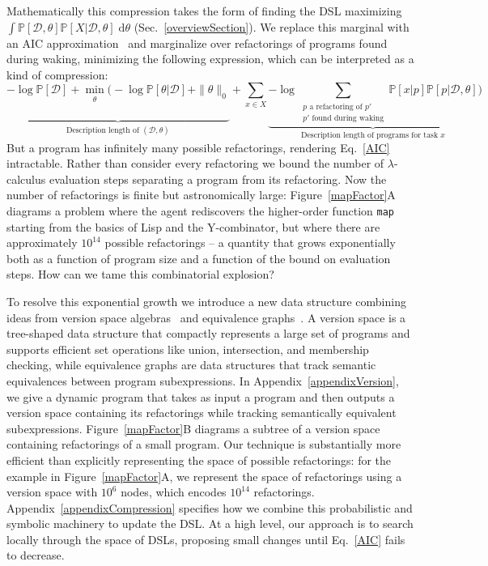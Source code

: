 \documentclass{article}
\newcommand{\code}[1]{{\footnotesize\texttt{#1}}}
\newcommand{\probability}{\mathds{P}} %
\begin{document}
Mathematically this compression takes the form of
finding the DSL maximizing $\int \probability[\mathcal{D},\theta]\probability[X|\mathcal{D},\theta]\;\mathrm{d}\theta$ (Sec.~\ref{overviewSection}).
We replace this marginal with an AIC approximation~\cite{akaike1998information}
and marginalize over refactorings of programs found during waking, minimizing the following expression,
which can be interpreted as a kind of compression:
\begin{equation}
\underbrace{-\log \probability[\mathcal{D}] + \min_{\substack{\theta\\\\\\\\}}\Bigg(-\log
\probability[\theta|\mathcal{D}] + \|\theta\|_0}_{\text{Description length of }(\mathcal{D},\theta)} +\sum_{x\in
  X}\underbrace{-\log \sum_{\substack{p \text{ a refactoring of } p'\\ p'\text{ found during waking}}}\probability[x|p]\probability[p|\mathcal{D},\theta]}_{\text{Description length of programs for task }x}\Bigg)
\label{AIC}
\end{equation}
But a program has infinitely many possible refactorings, rendering
Eq.~\ref{AIC} intractable.  Rather than consider every refactoring we
bound the number of $\lambda$-calculus evaluation steps separating a
program from its refactoring.  Now the number of refactorings is
finite but astronomically large: Figure~\ref{mapFactor}A diagrams a
problem where the agent rediscovers the higher-order function
\code{map} starting from the basics of Lisp and the Y-combinator, but
where there are approximately $10^{14}$ possible refactorings -- a quantity
that grows exponentially both as a function of program size and a
function of the bound on evaluation steps. How can we tame this
combinatorial explosion?

To resolve this exponential growth we introduce a new data structure
combining ideas from version space
algebras~\cite{lau2001programming,mitchell1977version,polozov2015flashmeta}
and equivalence graphs~\cite{tate2009equality}. A version space is a
tree-shaped data structure that compactly represents a large set of
programs and supports efficient set operations like union,
intersection, and membership checking, while equivalence graphs are
data structures that track semantic equivalences between program
subexpressions.  In Appendix~\ref{appendixVersion}, we give a dynamic
program that takes as input a program and then outputs a version space
containing its refactorings while tracking semantically equivalent
subexpressions. Figure~\ref{mapFactor}B diagrams a subtree of a
version space containing refactorings of a small program. Our
technique is substantially more efficient than explicitly representing
the space of possible refactorings: for the example in
Figure~\ref{mapFactor}A, we represent the space of refactorings using
a version space with $10^6$ nodes, which encodes $10^{14}$
refactorings. Appendix~\ref{appendixCompression} specifies how we
combine this probabilistic and symbolic machinery to update the DSL.
At a high level, our approach is to search locally through the space
of DSLs, proposing small changes until Eq.~\ref{AIC} fails to
decrease.
\end{document}
